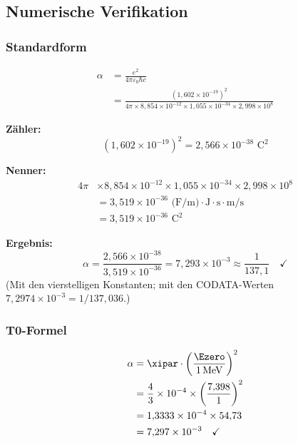	\subsection{Numerische Verifikation}
	
	\subsubsection{Standardform}
	
	\begin{align}
		\alpha &= \frac{e^2}{4\pi\varepsilon_0\hbar c} \\
		&= \frac{(1{,}602 \times 10^{-19})^2}{4\pi \times 8{,}854 \times 10^{-12} \times 1{,}055 \times 10^{-34} \times 2{,}998 \times 10^8}
	\end{align}
	
	\textbf{Zähler:}
	\begin{equation}
		(1{,}602 \times 10^{-19})^2 = 2{,}566 \times 10^{-38} \text{ C}^2
	\end{equation}
	
	\textbf{Nenner:}
	\begin{align}
		4\pi &\times 8{,}854 \times 10^{-12} \times 1{,}055 \times 10^{-34} \times 2{,}998 \times 10^8 \\
		&= 3{,}519 \times 10^{-36} \text{ (F/m)}\cdot\text{J}\cdot\text{s}\cdot\text{m/s} \\
		&= 3{,}519 \times 10^{-36} \text{ C}^2
	\end{align}
	
	\textbf{Ergebnis:}
	\begin{equation}
		\alpha = \frac{2{,}566 \times 10^{-38}}{3{,}519 \times 10^{-36}} = 7{,}293 \times 10^{-3} \approx \frac{1}{137{,}1} \quad \checkmark
	\end{equation}
	(Mit den vierstelligen Konstanten; mit den CODATA-Werten $7{,}2974 \times 10^{-3} = 1/137{,}036$.)
	
	\subsubsection{T0-Formel}
	
	\begin{align}
		\alpha &= \xipar \cdot \left(\frac{\Ezero}{1\,\text{MeV}}\right)^2 \\
		&= \frac{4}{3} \times 10^{-4} \times \left(\frac{7{,}398}{1}\right)^2 \\
		&= 1{,}3333 \times 10^{-4} \times 54{,}73 \\
		&= 7{,}297 \times 10^{-3} \quad \checkmark
	\end{align}
	
